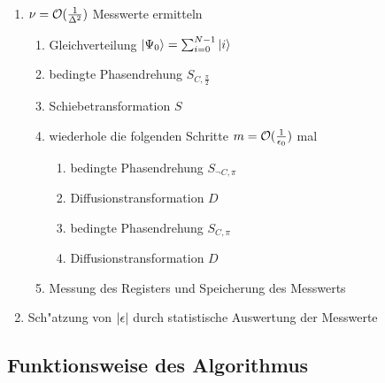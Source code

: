          \begin{enumerate}
         \item $\nu={\cal O}(\frac{1}{\Delta^2})$ Messwerte ermitteln
         \begin{enumerate}
           \item Gleichverteilung $ \left| \Psi_0 \right> = \sum_{i=0}^{N-1} \left| i \right> $
           \item bedingte Phasendrehung $S_{C,\frac{\pi}{2}}$ 
           \item Schiebetransformation $S$ 
           \item wiederhole die folgenden Schritte $m={\cal O}(\frac{1}{\epsilon_0})$ mal
             \begin{enumerate}
               \item bedingte Phasendrehung $S_{\neg C,\pi}$ 
               \item Diffusionstransformation $D$ 
               \item bedingte Phasendrehung $S_{C,\pi}$
               \item Diffusionstransformation $D$ 
             \end{enumerate}
           \item Messung des Registers und Speicherung des Messwerts
         \end{enumerate}
         \item Sch"atzung von $\vert \epsilon \vert$ durch statistische Auswertung der Messwerte
         \end{enumerate}
         \subsection{Funktionsweise des Algorithmus}
